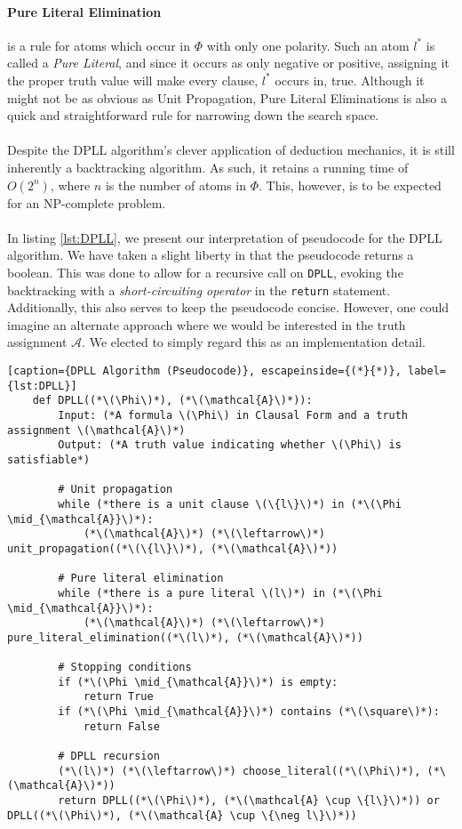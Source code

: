 \paragraph{Pure Literal Elimination} is a rule for atoms which occur in \(\Phi\) with only one polarity. Such an atom \(l^{*}\) is called a \emph{Pure Literal}, and since it occurs as only negative or positive, assigning it the proper truth value will make every clause, \(l^{*}\) occurs in, true. Although it might not be as obvious as Unit Propagation, Pure Literal Eliminations is also a quick and straightforward rule for narrowing down the search space.
\\
\\
Despite the DPLL algorithm's clever application of deduction mechanics, it is still inherently a backtracking algorithm. As such, it retains a running time of \(O(2^n)\), where \(n\) is the number of atoms in \(\Phi\). This, however, is to be expected for an NP-complete problem.
\\
\\
In listing \ref{lst:DPLL}, we present our interpretation of pseudocode for the DPLL algorithm. We have taken a slight liberty in that the pseudocode returns a boolean. This was done to allow for a recursive call on \texttt{DPLL}, evoking the backtracking with a \emph{short-circuiting operator} in the \texttt{return} statement. Additionally, this also serves to keep the pseudocode concise. However, one could imagine an alternate approach where we would be interested in the truth assignment \(\mathcal{A}\). We elected to simply regard this as an implementation detail.

\begin{lstlisting}[caption={DPLL Algorithm (Pseudocode)}, escapeinside={(*}{*)}, label={lst:DPLL}]
    def DPLL((*\(\Phi\)*), (*\(\mathcal{A}\)*)):
        Input: (*A formula \(\Phi\) in Clausal Form and a truth assignment \(\mathcal{A}\)*)
        Output: (*A truth value indicating whether \(\Phi\) is satisfiable*)

        # Unit propagation
        while (*there is a unit clause \(\{l\}\)*) in (*\(\Phi \mid_{\mathcal{A}}\)*):
            (*\(\mathcal{A}\)*) (*\(\leftarrow\)*) unit_propagation((*\(\{l\}\)*), (*\(\mathcal{A}\)*))

        # Pure literal elimination
        while (*there is a pure literal \(l\)*) in (*\(\Phi \mid_{\mathcal{A}}\)*):
            (*\(\mathcal{A}\)*) (*\(\leftarrow\)*) pure_literal_elimination((*\(l\)*), (*\(\mathcal{A}\)*))

        # Stopping conditions
        if (*\(\Phi \mid_{\mathcal{A}}\)*) is empty:
            return True
        if (*\(\Phi \mid_{\mathcal{A}}\)*) contains (*\(\square\)*):
            return False

        # DPLL recursion
        (*\(l\)*) (*\(\leftarrow\)*) choose_literal((*\(\Phi\)*), (*\(\mathcal{A}\)*))
        return DPLL((*\(\Phi\)*), (*\(\mathcal{A} \cup \{l\}\)*)) or DPLL((*\(\Phi\)*), (*\(\mathcal{A} \cup \{\neg l\}\)*))
\end{lstlisting}

